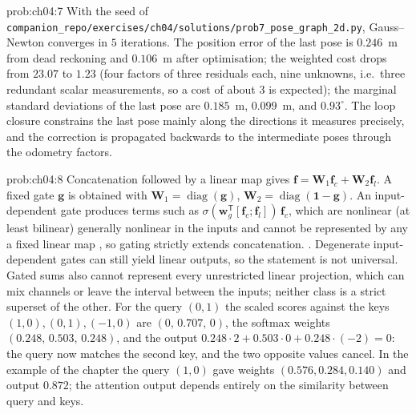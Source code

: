 \documentclass[graybox,envcountchap]{style/SNmono}
\DeclareMathOperator{\diag}{diag}
\newcommand{\repopath}[1]{\texttt{#1}}
\providecommand{\DIFadd}[1]{{\protect\color{blue} #1}} %
\providecommand{\DIFdel}[1]{{\protect\color{red} #1}} %
\providecommand{\DIFaddbegin}{} %
\providecommand{\DIFaddend}{} %
\providecommand{\DIFdelbegin}{} %
\providecommand{\DIFdelend}{} %
\begin{document}
\begin{sol}{prob:ch04:7}
With the seed of \repopath{companion\_\allowbreak repo/\allowbreak exercises/\allowbreak ch04/\allowbreak solutions/\allowbreak prob7\_\allowbreak pose\_\allowbreak graph\_\allowbreak 2d.py}, Gauss--Newton converges in $5$ iterations. The position error of the last pose is $0.246$~m from dead reckoning and $0.106$~m after optimisation; the weighted cost drops from $23.07$ to $1.23$ (four factors of three residuals each, nine unknowns, i.e.\ three redundant scalar measurements, so a cost of about $3$ is expected); the marginal standard deviations of the last pose are $0.185$~m, $0.099$~m, and $0.93^{\circ}$. The loop closure constrains the last pose mainly along the directions it measures precisely, and the correction is propagated backwards to the intermediate poses through the odometry factors.
\end{sol}
\begin{sol}{prob:ch04:8}
Concatenation followed by a linear map gives $\mathbf{f}=\mathbf{W}_1\mathbf{f}_c+\mathbf{W}_2\mathbf{f}_l$. A fixed gate $\mathbf{g}$ is obtained with $\mathbf{W}_1=\diag(\mathbf{g})$, $\mathbf{W}_2=\diag(\mathbf{1}-\mathbf{g})$. An input-dependent gate produces terms such as $\sigma(\mathbf{w}_g^{\mathsf T}[\mathbf{f}_c;\mathbf{f}_l])\,\mathbf{f}_c$, which are \DIFdelbegin \DIFdel{nonlinear (at least bilinear) }\DIFdelend \DIFaddbegin \DIFadd{generally nonlinear }\DIFaddend in the inputs and cannot be represented by \DIFdelbegin \DIFdel{any }\DIFdelend \DIFaddbegin \DIFadd{a }\DIFaddend fixed linear map\DIFdelbegin \DIFdel{, so gating strictly extends concatenation. }\DIFdelend \DIFaddbegin \DIFadd{. Degenerate input-dependent gates can still yield linear outputs, so the statement is not universal. Gated sums also cannot represent every unrestricted linear projection, which can mix channels or leave the interval between the inputs; neither class is a strict superset of the other. }\DIFaddend For the query $(0,1)$ the scaled scores against the keys $(1,0),(0,1),(-1,0)$ are $(0,\,0.707,\,0)$, the softmax weights $(0.248,\,0.503,\,0.248)$, and the output $0.248\cdot2+0.503\cdot0+0.248\cdot(-2)=0$: the query now matches the second key, and the two opposite values cancel. In the example of the chapter the query $(1,0)$ gave weights $(0.576,0.284,0.140)$ and output $0.872$; the attention output depends entirely on the similarity between query and keys.
\end{sol}
\end{document}
